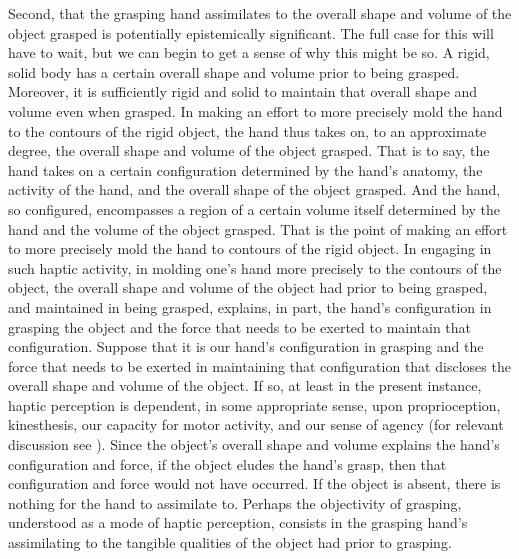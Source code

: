 \documentclass[12pt]{article}
\begin{document}
Second, that the grasping hand assimilates to the overall shape and volume of the object grasped is potentially epistemically significant. The full case for this will have to wait, but we can begin to get a sense of why this might be so. A rigid, solid body has a certain overall shape and volume prior to being grasped. Moreover, it is sufficiently rigid and solid to maintain that overall shape and volume even when grasped. In making an effort to more precisely mold the hand to the contours of the rigid object, the hand thus takes on, to an approximate degree, the overall shape and volume of the object grasped. That is to say, the hand takes on a certain configuration determined by the hand's anatomy, the activity of the hand, and the overall shape of the object grasped. And the hand, so configured, encompasses a region of a certain volume itself determined by the hand and the volume of the object grasped. That is the point of making an effort to more precisely mold the hand to contours of the rigid object. In engaging in such haptic activity, in molding one's hand more precisely to the contours of the object, the overall shape and volume of the object had prior to being grasped, and maintained in being grasped, explains, in part, the hand's configuration in grasping the object and the force that needs to be exerted to maintain that configuration. Suppose that it is our hand's configuration in grasping and the force that needs to be exerted in maintaining that configuration that discloses the overall shape and volume of the object. If so, at least in the present instance, haptic perception is dependent, in some appropriate sense, upon proprioception, kinesthesis, our capacity for motor activity, and our sense of agency (for relevant discussion see \citealt{OShaughnessy:1989zp,OShaughnessy:1995ty,Martin:1992aa,Fulkerson:2014ek}). Since the object's overall shape and volume explains the hand's configuration and force, if the object eludes the hand's grasp, then that configuration and force would not have occurred. If the object is absent, there is nothing for the hand to assimilate to. Perhaps the objectivity of grasping, understood as a mode of haptic perception, consists in the grasping hand's assimilating to the tangible qualities of the object had prior to grasping.
\end{document}

